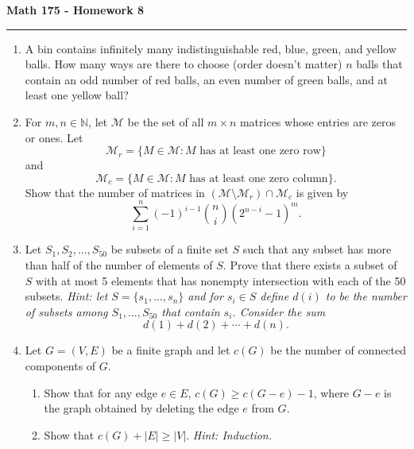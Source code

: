 \documentclass[11pt,letterpaper]{report}
\newcommand{\naturals}{\mathbb{N}}
\newcommand{\mcal}[1]{\mathcal{#1}}
\begin{document}
\begin{center}
{\bf \Large Math 175 - Homework 8}
\vspace{0.2cm}
\hrule
\end{center}

\begin{enumerate}
	\item A bin contains infinitely many indistinguishable red, blue, green, and yellow balls. How many ways are there to choose (order doesn't matter) $n$ balls that contain an odd number of red balls, an even number of green balls, and at least one yellow ball?
	\vfill
	\item For $m, n\in \naturals$, let $\mcal{M}$ be the set of all $m\times n$ matrices whose entries are zeros or ones. Let 
	\[
	\mcal{M}_r = \{M\in \mcal{M}: M\text{ has at least one zero row}\}
	\]
	and
	\[
	\mcal{M}_c = \{M\in \mcal{M}: M\text{ has at least one zero column}\}.
	\]
	Show that the number of matrices in $(\mcal{M}\setminus \mcal{M}_r)\cap \mcal{M}_c$ is given by
	\[
	\sum_{i=1}^n(-1)^{i-1}\binom{n}{i}(2^{n-i}-1)^m.
	\]
	\vfill
	\item Let $S_1, S_2, \ldots, S_{50}$ be subsets of a finite set $S$ such that any subset has more than half of the number of elements of $S$. Prove that there exists a subset of $S$ with at most 5 elements that has nonempty intersection with each of the 50 subsets. \textit{Hint: let $S = \{s_1, \ldots, s_n\}$ and for $s_i\in S$ define $d(i)$ to be the number of subsets among $S_1, \ldots, S_{50}$ that contain $s_i$. Consider the sum}
	\[
	d(1) + d(2) + \cdots +d(n).
	\]
	\vfill
	\item Let $G = (V, E)$ be a finite graph and let $c(G)$ be the number of connected components of $G$.
	\begin{enumerate}
		\item Show that for any edge $e\in E$, $c(G) \geq c(G-e)-1$, where $G - e$ is the graph obtained by deleting the edge $e$ from $G$.
		\vfill
		\item Show that $c(G) + |E| \geq |V|$. \textit{Hint: Induction.}
	\end{enumerate}
	\vfill\pagebreak


\end{enumerate}
\end{document}
